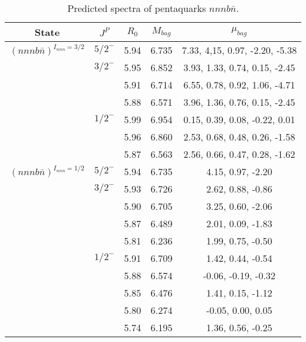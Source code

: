 \documentclass[prd,twocolumn,floatfix,nofootinbib]{revtex4}
\begin{document}
\renewcommand{\tabcolsep}{0.5cm}
\renewcommand{\arraystretch}{1.2}
\begin{table*}[!htbp]
    \caption{Predicted spectra of pentaquarks $nnnb\bar{n}$.}
    \begin{tabular}{ccccc}
        \hline\hline
        {\rm State} &$J^{P}$ &$R_{0}$ &$M_{bag}$ &$\mu_{bag}$ \\ \hline
        ${(nnnb\bar{n})}^{I_{nnn}=3/2}$
            &${5/2}^{-}$    &5.94   &6.735  &7.33, 4,15, 0.97, -2.20, -5.38 \\
            &${3/2}^{-}$    &5.95   &6.852  &3.93, 1.33, 0.74, 0.15, -2.45 \\
            &               &5.91   &6.714  &6.55, 0.78, 0.92, 1.06, -4.71 \\
            &               &5.88   &6.571  &3.96, 1.36, 0.76, 0.15, -2.45 \\
            &${1/2}^{-}$    &5.99   &6.954  &0.15, 0.39, 0.08, -0.22, 0.01 \\
            &               &5.96   &6.860  &2.53, 0.68, 0.48, 0.26, -1.58 \\
            &               &5.87   &6.563  &2.56, 0.66, 0.47, 0.28, -1.62 \\
        ${(nnnb\bar{n})}^{I_{nnn}=1/2}$
            &${5/2}^{-}$    &5.94   &6.735  &4.15, 0.97, -2.20 \\
            &${3/2}^{-}$    &5.93   &6.726  &2.62, 0.88, -0.86 \\
            &               &5.90   &6.705  &3.25, 0.60, -2.06 \\
            &               &5.87   &6.489  &2.01, 0.09, -1.83 \\
            &               &5.81   &6.236  &1.99, 0.75, -0.50 \\
            &${1/2}^{-}$    &5.91   &6.709  &1.42, 0.44, -0.54 \\
            &               &5.88   &6.574  &-0.06, -0.19, -0.32 \\
            &               &5.85   &6.476  &1.41, 0.15, -1.12 \\
            &               &5.80   &6.274  &-0.05, 0.00, 0.05 \\
            &               &5.74   &6.195  &1.36, 0.56, -0.25 \\
        \hline\hline
    \end{tabular}
\end{table*}
\end{document}
